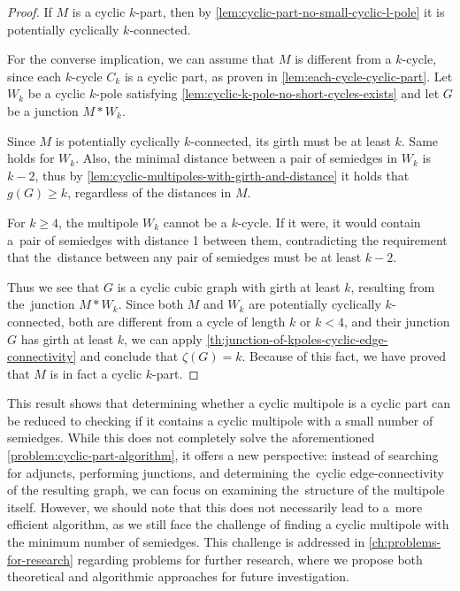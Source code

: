 \documentclass[12pt, twoside]{book}
\begin{document}
\begin{proof}
	If $M$ is a cyclic $k$-part, then by \cref{lem:cyclic-part-no-small-cyclic-l-pole} it is potentially cyclically $k$-connected.
	
	For the converse implication, we can assume that $M$ is different from a $k$-cycle, since each $k$-cycle $C_k$ is a cyclic part, as proven in \cref{lem:each-cycle-cyclic-part}. Let $W_k$ be a cyclic $k$-pole satisfying \cref{lem:cyclic-k-pole-no-short-cycles-exists} and let $G$ be a junction $M*W_k$.
	
	Since $M$ is potentially cyclically $k$-connected, its girth must be at least $k$. Same holds for $W_k$. Also, the minimal distance between a pair of semiedges in $W_k$ is $k-2$, thus by \cref{lem:cyclic-multipoles-with-girth-and-distance} it holds that $g(G)\geq k$, regardless of the distances in $M$.
	
	For $k\geq 4$, the multipole $W_k$ cannot be a $k$-cycle. If it were, it would contain a~pair of semiedges with distance 1 between them, contradicting the requirement that the~distance between any pair of semiedges must be at least $k-2$.
	
	Thus we see that $G$ is a cyclic cubic graph with girth at least $k$, resulting from the~junction ${M*W_k}$. Since both $M$ and $W_k$ are potentially cyclically \mbox{$k$-connected}, both are different from a cycle of length $k$ or $k<4$, and their junction $G$ has girth at least $k$, we can apply \cref{th:junction-of-kpoles-cyclic-edge-connectivity} and conclude that $\zeta(G)=k$. Because of this fact, we have proved that $M$ is in fact a cyclic $k$-part.
\end{proof}

This result shows that determining whether a cyclic multipole is a cyclic part can be reduced to checking if it contains a cyclic multipole with a small number of semiedges. While this does not completely solve the aforementioned \cref{problem:cyclic-part-algorithm}, it offers a new perspective: instead of searching for adjuncts, performing junctions, and determining the~cyclic edge-connectivity of the resulting graph, we can focus on examining the~structure of the multipole itself. However, we should note that this does not necessarily lead to a~more efficient algorithm, as we still face the challenge of finding a cyclic multipole with the minimum number of semiedges. This challenge is addressed in \cref{ch:problems-for-research} regarding problems for further research, where we propose both theoretical and algorithmic approaches for future investigation.
\end{document}
